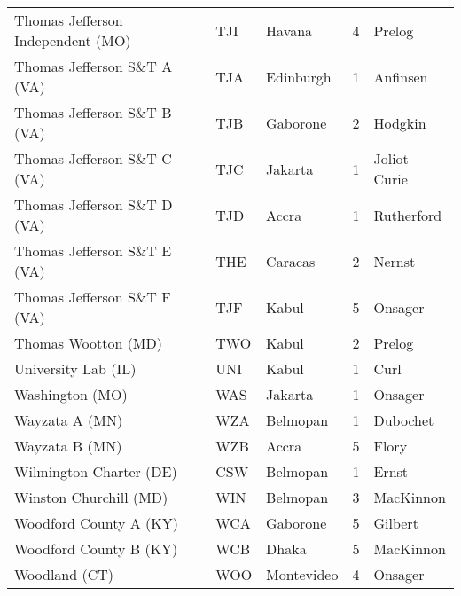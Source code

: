 \documentclass{article}%
\begin{document}
\begin{longtable}{|ll|lc|l|}
Thomas Jefferson Independent (MO)&TJI&Havana&4&Prelog\\%
Thomas Jefferson S\&T A (VA)&TJA&Edinburgh&1&Anfinsen\\%
Thomas Jefferson S\&T B (VA)&TJB&Gaborone&2&Hodgkin\\%
Thomas Jefferson S\&T C (VA)&TJC&Jakarta&1&Joliot{-}Curie\\%
Thomas Jefferson S\&T D (VA)&TJD&Accra&1&Rutherford\\%
Thomas Jefferson S\&T E (VA)&THE&Caracas&2&Nernst\\%
Thomas Jefferson S\&T F (VA)&TJF&Kabul&5&Onsager\\%
Thomas Wootton (MD)&TWO&Kabul&2&Prelog\\%
University Lab (IL)&UNI&Kabul&1&Curl\\%
Washington (MO)&WAS&Jakarta&1&Onsager\\%
Wayzata A (MN)&WZA&Belmopan&1&Dubochet\\%
Wayzata B (MN)&WZB&Accra&5&Flory\\%
Wilmington Charter (DE)&CSW&Belmopan&1&Ernst\\%
Winston Churchill (MD)&WIN&Belmopan&3&MacKinnon\\%
Woodford County A (KY)&WCA&Gaborone&5&Gilbert\\%
Woodford County B (KY)&WCB&Dhaka&5&MacKinnon\\%
Woodland (CT)&WOO&Montevideo&4&Onsager\\%
\end{longtable}%
\end{document}
